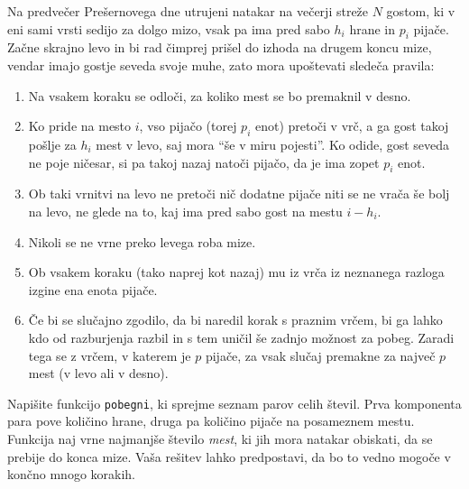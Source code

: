 \documentclass[arhiv]{../izpit}
\begin{document}


\naloga

Na predvečer Prešernovega dne utrujeni natakar na večerji streže $N$ gostom, ki v eni sami vrsti sedijo za dolgo mizo, vsak pa ima pred sabo $h_i$ hrane in $p_i$ pijače. Začne skrajno levo in bi rad čimprej prišel do izhoda na drugem koncu mize, vendar imajo gostje seveda svoje muhe, zato mora upoštevati sledeča pravila:

\begin{enumerate}
  \item Na vsakem koraku se odloči, za koliko mest se bo premaknil v desno. 
  \item\label{i:obisk} Ko pride na mesto $i$, vso pijačo (torej $p_i$ enot) pretoči v vrč, a ga gost takoj pošlje za $h_i$ mest v levo, saj mora ``še v miru pojesti''. Ko odide, gost seveda ne poje ničesar, si pa takoj nazaj natoči pijačo, da je ima zopet $p_i$ enot.
  \item Ob taki vrnitvi na levo ne pretoči nič dodatne pijače niti se ne vrača še bolj na levo, ne glede na to, kaj ima pred sabo gost na mestu $i - h_i$.
  \item Nikoli se ne vrne preko levega roba mize.
  \item Ob vsakem koraku (tako naprej kot nazaj) mu iz vrča iz neznanega razloga izgine ena enota pijače.
  \item Če bi se slučajno zgodilo, da bi naredil korak s praznim vrčem, bi ga lahko kdo od razburjenja razbil in s tem uničil še zadnjo možnost za pobeg. Zaradi tega se z vrčem, v katerem je $p$ pijače, za vsak slučaj premakne za največ $p$ mest (v levo ali v desno).
\end{enumerate}

Napišite funkcijo \verb|pobegni|, ki sprejme seznam parov celih števil. Prva komponenta para pove količino hrane, druga pa količino pijače na posameznem mestu. Funkcija naj vrne najmanjše število \emph{mest}, ki jih mora natakar obiskati, da se prebije do konca mize. Vaša rešitev lahko predpostavi, da bo to vedno mogoče v končno mnogo korakih.
\end{document}
